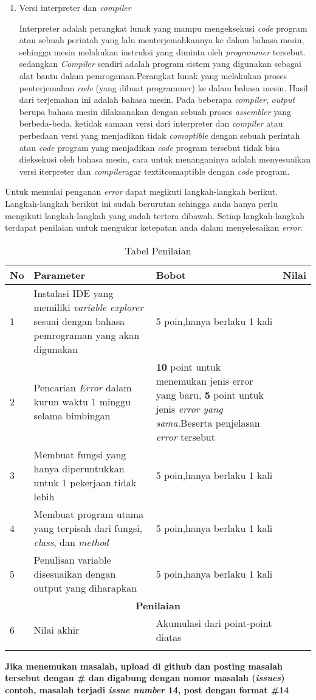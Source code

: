 \begin{enumerate}
\begin{enumerate}
\end{enumerate}
\item Versi interpreter dan \textit{compiler}
\par
Interpreter adalah perangkat lunak yang mampu mengeksekusi \textit{code} program atau sebuah perintah yang lalu menterjemahkannya ke dalam bahasa mesin, sehingga mesin melakukan instruksi yang diminta oleh \textit{programmer} tersebut. sedangkan \textit{Compiler} sendiri adalah program sistem yang digunakan sebagai alat bantu dalam pemrogaman.Perangkat lunak yang melakukan proses penterjemahan \textit{code} (yang dibuat programmer) ke dalam bahasa mesin. Hasil dari terjemahan ini adalah bahasa mesin. Pada beberapa \textit{compiler}, \textit{output} berupa bahasa mesin dilaksanakan dengan sebuah proses \textit{assembler} yang berbeda-beda. ketidak samaan versi dari interpreter dan \textit{compiler} atau perbedaan versi yang menjadikan tidak \textit{comaptible} dengan sebuah perintah atau \textit{code} program yang menjadikan \textit{code} program tersebut tidak bisa dieksekusi oleh bahasa mesin, cara untuk menanganinya adalah menyesuaikan versi iterpreter dan \textit{compiler}agar textit{comaptible} dengan \textit{code} program.
\end{enumerate}
\par 
Untuk memulai penganan \textit{error} dapat megikuti langkah-langkah berikut.
 Langkah-langkah berikut ini sudah berurutan sehingga anda hanya perlu mengikuti langkah-langkah yang sudah tertera dibawah. Setiap langkah-langkah terdapat penilaian untuk mengukur ketepatan anda dalam menyelesaikan \textit{error}.
 
 \begin{longtable}{|p{}|p{}|p{}|p{}|}
\hline
No&Parameter&Bobot&Nilai\\
\hline
1 &Instalasi IDE yang memiliki \textit{variable explorer} sesuai dengan bahasa pemrograman yang akan digunakan&5 poin,hanya berlaku 1 kali & \\ \hline
2 &Pencarian \textit{Error} dalam kurun waktu 1 minggu selama bimbingan&\textbf{10} point untuk menemukan jenis error yang baru, \textbf{5} point untuk jenis \textit{error yang sama}.Beserta penjelasan \textit{error} tersebut & \\ \hline
3 &Membuat fungsi yang hanya diperuntukkan untuk 1 pekerjaan tidak lebih&5 poin,hanya berlaku 1 kali & \\ \hline
4 &Membuat program utama yang terpisah dari fungsi, \textit{class}, dan \textit{method}&5 poin,hanya berlaku 1 kali & \\ \hline
5 &Penulisan variable disesuaikan dengan output yang diharapkan& 5 poin,hanya berlaku 1 kali& \\ \hline

\multicolumn{4}{c}{\textbf{Penilaian}}\\ \hline

6 &Nilai akhir&Akumulasi dari point-point diatas & \\ \hline

\caption{Tabel Penilaian}
\label{table:contoh}
\end{longtable}

\textbf{Jika menemukan masalah, upload di github dan posting masalah tersebut dengan \# dan digabung dengan nomor masalah (\textit{issues}) contoh, masalah terjadi \textit{issue number} 14, post dengan format \#14}
